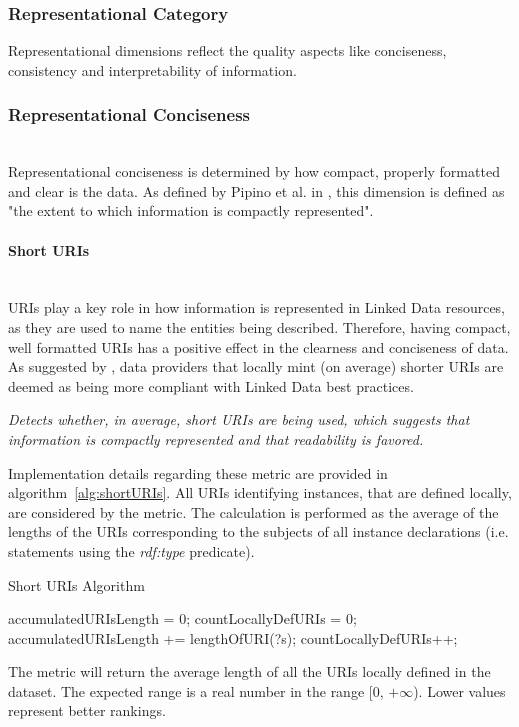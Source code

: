 
\subsubsection{Representational Category}
\label{sec:Representational} 

Representational dimensions reflect the quality aspects like conciseness, consistency and interpretability of information.

\subsubsection{Representational Conciseness}~\\ %
Representational conciseness is determined by how compact, properly formatted and clear is the data. As defined by Pipino et al. in \cite{Pipino2002}, this dimension is defined as "the extent to which information is compactly represented". 


\paragraph{Short URIs} ~\\
URIs play a key role in how information is represented in Linked Data resources, as they are used to name the entities being described. Therefore, having compact, well formatted URIs has a positive effect in the clearness and conciseness of data. 
As suggested by \cite{Hogan2012:LDC}, data providers that locally mint (on average) shorter URIs are deemed as being more compliant with Linked Data best practices.

\begin{mdframed}[style=metricdefinition]
\emph{Detects whether, in average, short URIs are being used, which suggests that information is compactly represented and that readability is favored.}
\end{mdframed}

Implementation details regarding these metric are provided in algorithm~\ref{alg:shortURIs}. All URIs identifying instances, that are defined locally, are considered by the metric. The calculation is performed as the average of the lengths of the URIs corresponding to the subjects of all instance declarations (i.e. statements using the \textit{rdf:type} predicate).
\begin{algorithm}
\caption{Short URIs Algorithm} \label{alg:shortURIs}
\begin{algorithmic}[1]
\State accumulatedURIsLength = 0;
\State countLocallyDefURIs = 0;
\EndProcedure
{}
\State accumulatedURIsLength += lengthOfURI(?s);
\State countLocallyDefURIs++;
\EndIf ~\\
\EndProcedure
\end{algorithmic}
\end{algorithm}
The metric will return the average length of all the URIs locally defined in the dataset. The expected range is a real number in the range [0, $+\infty$). Lower values represent better rankings.

